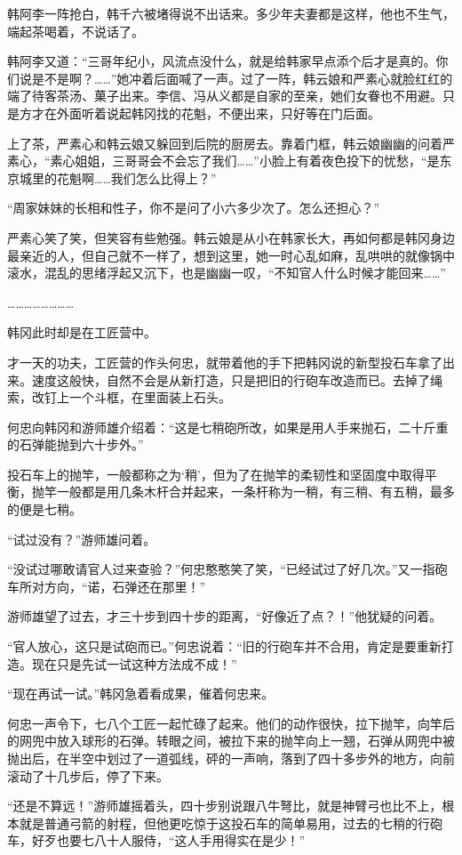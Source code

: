 韩阿李一阵抢白，韩千六被堵得说不出话来。多少年夫妻都是这样，他也不生气，端起茶喝着，不说话了。

韩阿李又道：“三哥年纪小，风流点没什么，就是给韩家早点添个后才是真的。你们说是不是啊？……”她冲着后面喊了一声。过了一阵，韩云娘和严素心就脸红红的端了待客茶汤、菓子出来。李信、冯从义都是自家的至亲，她们女眷也不用避。只是方才在外面听着说起韩冈找的花魁，不便出来，只好等在门后面。

上了茶，严素心和韩云娘又躲回到后院的厨房去。靠着门框，韩云娘幽幽的问着严素心，“素心姐姐，三哥哥会不会忘了我们……”小脸上有着夜色投下的忧愁，“是东京城里的花魁啊……我们怎么比得上？”

“周家妹妹的长相和性子，你不是问了小六多少次了。怎么还担心？”

严素心笑了笑，但笑容有些勉强。韩云娘是从小在韩家长大，再如何都是韩冈身边最亲近的人，但自己就不一样了，想到这里，她一时心乱如麻，乱哄哄的就像锅中滚水，混乱的思绪浮起又沉下，也是幽幽一叹，“不知官人什么时候才能回来……”

……………………

韩冈此时却是在工匠营中。

才一天的功夫，工匠营的作头何忠，就带着他的手下把韩冈说的新型投石车拿了出来。速度这般快，自然不会是从新打造，只是把旧的行砲车改造而已。去掉了绳索，改钉上一个斗框，在里面装上石头。

何忠向韩冈和游师雄介绍着：“这是七稍砲所改，如果是用人手来抛石，二十斤重的石弹能抛到六十步外。”

投石车上的抛竿，一般都称之为‘稍’，但为了在抛竿的柔韧性和坚固度中取得平衡，抛竿一般都是用几条木杆合并起来，一条杆称为一稍，有三稍、有五稍，最多的便是七稍。

“试过没有？”游师雄问着。

“没试过哪敢请官人过来查验？”何忠憨憨笑了笑，“已经试过了好几次。”又一指砲车所对方向，“诺，石弹还在那里！”

游师雄望了过去，才三十步到四十步的距离，“好像近了点？！”他犹疑的问着。

“官人放心，这只是试砲而已。”何忠说着：“旧的行砲车并不合用，肯定是要重新打造。现在只是先试一试这种方法成不成！”

“现在再试一试。”韩冈急着看成果，催着何忠来。

何忠一声令下，七八个工匠一起忙碌了起来。他们的动作很快，拉下抛竿，向竿后的网兜中放入球形的石弹。转眼之间，被拉下来的抛竿向上一翘，石弹从网兜中被抛出后，在半空中划过了一道弧线，砰的一声响，落到了四十多步外的地方，向前滚动了十几步后，停了下来。

“还是不算远！”游师雄摇着头，四十步别说跟八牛弩比，就是神臂弓也比不上，根本就是普通弓箭的射程，但他更吃惊于这投石车的简单易用，过去的七稍的行砲车，好歹也要七八十人服侍，“这人手用得实在是少！”

